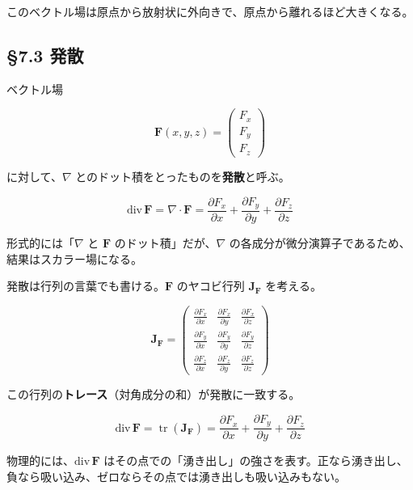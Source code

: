 \documentclass[a4paper,12pt,openany]{book}
\begin{document}
このベクトル場は原点から放射状に外向きで、原点から離れるほど大きくなる。

\par\vspace{0.35em}\par

\hypertarget{ux767aux6563}{%
\subsection{§7.3 発散}\label{ux767aux6563}}

ベクトル場

\[
\mathbf{F}(x,y,z)
=
\begin{pmatrix}
F_x\\
F_y\\
F_z
\end{pmatrix}
\]

に対して、\(\nabla\) とのドット積をとったものを\textbf{発散}と呼ぶ。

\[\mathrm{div}\,\mathbf{F} = \nabla \cdot \mathbf{F} = \frac{\partial F_x}{\partial x} + \frac{\partial F_y}{\partial y} + \frac{\partial F_z}{\partial z}\]

形式的には「\(\nabla\) と \(\mathbf{F}\) のドット積」だが、\(\nabla\)
の各成分が微分演算子であるため、結果はスカラー場になる。

発散は行列の言葉でも書ける。\(\mathbf{F}\) のヤコビ行列
\(\mathbf{J}_\mathbf{F}\) を考える。

\[\mathbf{J}_\mathbf{F} = \begin{pmatrix}
\frac{\partial F_x}{\partial x} & \frac{\partial F_x}{\partial y} & \frac{\partial F_x}{\partial z} \\[0.3em]
\frac{\partial F_y}{\partial x} & \frac{\partial F_y}{\partial y} & \frac{\partial F_y}{\partial z} \\[0.3em]
\frac{\partial F_z}{\partial x} & \frac{\partial F_z}{\partial y} & \frac{\partial F_z}{\partial z}
\end{pmatrix}\]

この行列の\textbf{トレース}（対角成分の和）が発散に一致する。

\[\mathrm{div}\,\mathbf{F} = \operatorname{tr}(\mathbf{J}_\mathbf{F}) = \frac{\partial F_x}{\partial x} + \frac{\partial F_y}{\partial y} + \frac{\partial F_z}{\partial z}\]

物理的には、\(\mathrm{div}\,\mathbf{F}\)
はその点での「湧き出し」の強さを表す。正なら湧き出し、負なら吸い込み、ゼロならその点では湧き出しも吸い込みもない。
\end{document}
